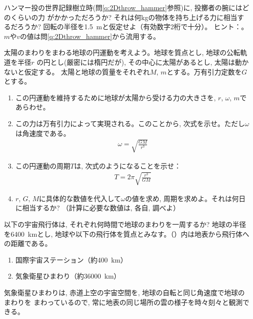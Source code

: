 \begin{q}\label{q:hammer_throw}
ハンマー投の世界記録樹立時(問\ref{q:2Dthrow_hammer}参照)に, 投擲者の腕にはどのくらいの力
がかかっただろうか? 
それは何kgの物体を持ち上げる力に相当するだろうか? 回転の半径を1.5~mと仮定せよ（有効数字2桁で十分）。
ヒント：。$m$や$v$の値は問\ref{q:2Dthrow_hammer}から流用する。
\end{q}
\vspace{0.2cm}

\begin{q}\label{q:sun_earth0}
太陽のまわりをまわる地球の円運動を考えよう。地球を質点とし, 地球の公転軌道を半径$r$
の円とし(厳密には楕円だが), その中心に太陽があるとし, 太陽は動かないと仮定する。
太陽と地球の質量をそれぞれ$M$, $m$とする。万有引力定数を$G$とする。
\begin{enumerate}
\item この円運動を維持するために地球が太陽から受ける力の大きさを, $r$, $\omega$, $m$であらわせ。
\item この力は万有引力によって実現される。このことから, 次式を示せ。ただし$\omega$は角速度である。
\begin{eqnarray}\omega=\sqrt{\frac{GM}{r^3}}\label{eq:circle_grav_omega}\end{eqnarray}
\item この円運動の周期$T$は, 次式のようになることを示せ：
\begin{eqnarray}T=2\pi\sqrt{\frac{r^3}{GM}}\label{eq:circle_grav_T}\end{eqnarray}
\item $r$, $G$, $M$に具体的な数値を代入して$\omega$の値を求め, 周期を求めよ。それは何日に相当するか? 
（計算に必要な数値は, 各自, 調べよ）
\end{enumerate}
\end{q}
\vspace{0.2cm}

\begin{q}\label{q:spaceship}
以下の宇宙飛行体は, それぞれ何時間で地球のまわりを一周するか? 地球の半径を6400~kmとし, 
地球や以下の飛行体を質点とみなす。（）内は地表から飛行体への距離である。
\begin{enumerate}
\item 国際宇宙ステーション（約400~km）
\item 気象衛星ひまわり（約36000~km）
\end{enumerate}
\end{q}

気象衛星ひまわりは, 赤道上空の宇宙空間を, 地球の自転と同じ角速度で地球のまわりを
まわっているので, 常に地表の同じ場所の雲の様子を時々刻々と観測できる。
\mv

